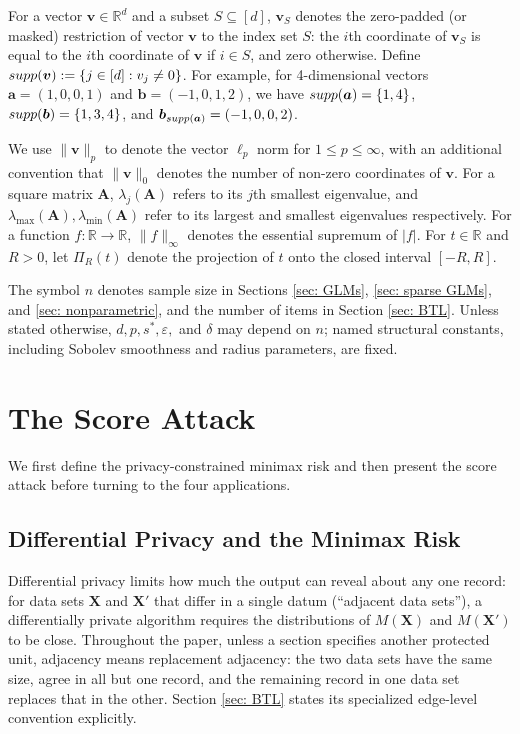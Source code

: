 \documentclass[letterpaper,12pt]{article}
\numberwithin{equation}{section}
\theoremstyle{plain}
\numberwithin{Theorem}{section}
\numberwithin{proposition}{section}
\numberwithin{Lemma}{section}
{
	\theoremstyle{definition}
	\newtheorem{Definition}{Definition}
	\newtheorem{example}{Example}
	\numberwithin{example}{section}
	\newtheorem{fact}{Fact}
	\numberwithin{fact}{section}
	\newtheorem{remark}{Remark}
}
\newcommand{\rev}[1]{#1}
\newcommand{\furtherrev}[1]{#1}
\newcommand{\1}{\mathbbm{1}}
\def\supp{{\rm supp}}
\def\R{{\mathbb R}}
\begin{document}
For a vector $\bm v \in \R^d$ and a subset $S \subseteq [d]$,  $\bm v_S$ denotes the \furtherrev{zero-padded (or masked) restriction} of vector $\bm v$ to the index set $S$: the $i$th coordinate of $\bm v_S$ is equal to the $i$th coordinate of $\bm v$ if $i \in S$, and zero otherwise. Define $\supp(\bm v) := \{j \in [d]: v_j \neq 0\}$. For example, for 4-dimensional vectors $\bm a = (1, 0, 0, 1)$ and $\bm b = (-1, 0, 1, 2)$, we have $\supp(\bm a) = \{1, 4\}$, $\supp(\bm b) = \{1, 3, 4\}$, and $\bm b_{\supp(\bm a)} = (-1, 0, 0, 2)$. 

We use $\|\bm v\|_p$ to denote the vector $\ell_p$ norm for $ 1\leq p \leq \infty$, with an additional convention that $\|\bm v\|_0$ denotes the number of non-zero coordinates of $\bm v$. For a square matrix $\bm A$, $\lambda_j(\bm A)$ refers to its $j$th smallest eigenvalue, and $\lambda_{\max}(\bm A), \lambda_{\min}(\bm A)$ refer to its largest and smallest eigenvalues respectively. For a function $f: \R \to \R$, $\|f\|_\infty$ denotes the essential supremum of $|f|$. For $t \in \R$ and $R > 0$, let $\Pi_R(t)$ denote the projection of $t$ onto the closed interval $[-R, R]$. 

The symbol $n$ denotes sample size in Sections \ref{sec: GLMs}, \ref{sec: sparse GLMs}, and \ref{sec: nonparametric}, and the number of items in Section \ref{sec: BTL}. \furtherrev{Unless stated otherwise, $d,p,s^*,\varepsilon,$ and $\delta$ may depend on $n$; named structural constants, including Sobolev smoothness and radius parameters, are fixed.}




  

 
\section{The Score Attack}\label{sec: setup}
 
We first define the privacy-constrained minimax risk and then present the score attack before turning to the four applications.

\subsection{Differential Privacy and the Minimax Risk}\label{sec: privacy constrained minimax risk}

Differential privacy limits how much the output can reveal about any one record: for data sets $\bm X$ and $\bm X'$ that differ in a single datum (``adjacent data sets''), a \rev{differentially private} algorithm requires the distributions of $M(\bm X)$ and $M(\bm X')$ to be close. \furtherrev{Throughout the paper, unless a section specifies another protected unit, adjacency means replacement adjacency: the two data sets have the same size, agree in all but one record, and the remaining record in one data set replaces that in the other. Section \ref{sec: BTL} states its specialized edge-level convention explicitly.}
  
\end{document}
